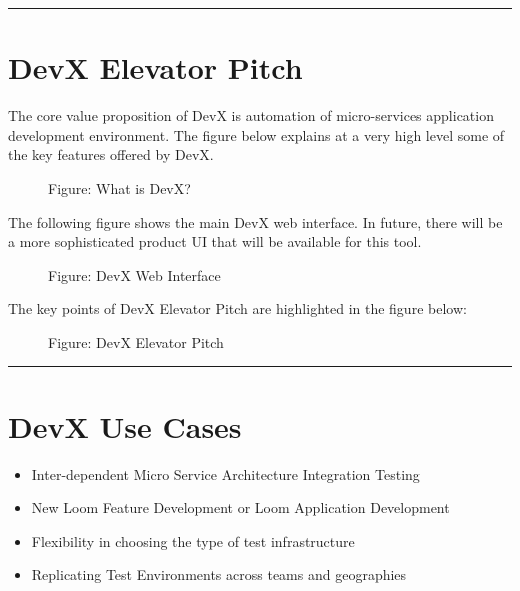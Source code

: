 \documentclass[letterpaper,10pt,english]{sphinxmanual}
\begin{document}
\bigskip\hrule\bigskip



\chapter{DevX Elevator Pitch}
\label{\detokenize{devx:devx-elevator-pitch}}\label{\detokenize{devx:para-ep}}
The core value proposition of DevX is automation of micro-services application development environment.  The figure below explains at a very high level some of the key features offered by DevX.

\begin{figure}[htbp]
\centering
\capstart

\noindent{}
\caption{Figure: What is DevX?}\label{\detokenize{devx:id2}}\end{figure}

The following figure shows the main DevX web interface. In future, there will be a more sophisticated product UI that will be available for this tool.

\begin{figure}[htbp]
\centering
\capstart

\noindent{}
\caption{Figure: DevX Web Interface}\label{\detokenize{devx:id3}}\end{figure}

The key points of DevX Elevator Pitch are highlighted in the figure below:

\begin{figure}[htbp]
\centering
\capstart

\noindent{}
\caption{Figure: DevX Elevator Pitch}\label{\detokenize{devx:id4}}\end{figure}


\bigskip\hrule\bigskip



\chapter{DevX Use Cases}
\label{\detokenize{devx:para-usecases}}\label{\detokenize{devx:devx-use-cases}}\begin{itemize}
\item {} 
Inter-dependent Micro Service Architecture Integration Testing

\item {} 
New Loom Feature Development or Loom Application Development

\item {} 
Flexibility in choosing the type of test infrastructure

\item {} 
Replicating Test Environments across teams and geographies

\end{itemize}
\end{document}
